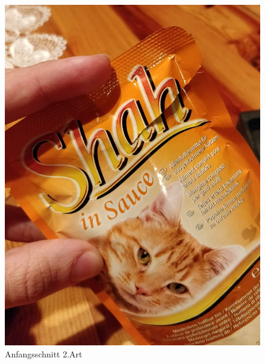 \begin{figure}[H]
\begin{minipage}[hbt]{.3\linewidth}
      \includegraphics[width=\linewidth]{Bilder/Schneideversuch_2.Art/Anfangsschnitt}
      \caption{Anfangsschnitt 2.Art}
      \label{Nach 3 Schnitten}
   \end{minipage}
\end{figure}


